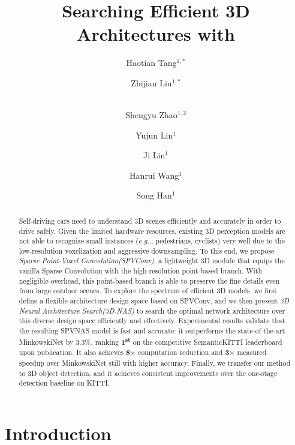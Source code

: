 \documentclass[runningheads]{llncs}
\title{Searching Efficient 3D Architectures with \\ \module}
\author{Haotian Tang$^{1,*}$ \and Zhijian Liu$^{1,*}$ \and \\ Shengyu Zhao$^{1,2}$ \and Yujun Lin$^{1}$ \and Ji Lin$^{1}$ \and Hanrui Wang$^{1}$ \and Song Han$^{1}$}
\institute{$^{1}$ Massachusetts Institute of Technology \\ $^{2}$ IIIS, Tsinghua University}
\makeatletter
\DeclareRobustCommand\onedot{\futurelet\@let@token\@onedot}
\def\@onedot{\ifx\@let@token.\else.\null\fi\xspace}
\def\eg{\emph{e.g}\onedot} \def\Eg{\emph{E.g}\onedot}
\def\module{Sparse Point-Voxel Convolution\xspace}
\def\moduleshort{SPVConv\xspace}
\def\modelshort{SPVNAS\xspace}
\def\nas{3D Neural Architecture Search\xspace}
\def\nasshort{3D-NAS\xspace}
\makeatother
\begin{document}
\pagestyle{headings}
\mainmatter

\maketitle


\begin{abstract}

Self-driving cars need to understand 3D scenes efficiently and accurately in order to drive safely. Given the limited hardware resources, existing 3D perception models are not able to recognize small instances (\eg, pedestrians, cyclists) very well due to the low-resolution voxelization and aggressive downsampling. To this end, we propose \emph{\module (\moduleshort)}, a lightweight 3D module that equips the vanilla Sparse Convolution with the high-resolution point-based branch. With negligible overhead, this point-based branch is able to preserve the fine details even from large outdoor scenes. To explore the spectrum of efficient 3D models, we first define a flexible architecture design space based on \moduleshort, and we then present \emph{\nas (\nasshort)} to search the optimal network architecture over this diverse design space efficiently and effectively. Experimental results validate that the resulting \modelshort model is fast and accurate: it outperforms the state-of-the-art MinkowskiNet by 3.3\%, ranking \textbf{1\textsuperscript{st}} on the competitive SemanticKITTI leaderboard upon publication. It also achieves \textbf{8$\times$} computation reduction and \textbf{3$\times$} measured speedup over MinkowskiNet still with higher accuracy. Finally, we transfer our method to 3D object detection, and it achieves consistent improvements over the one-stage detection baseline on KITTI.

\end{abstract} \section{Introduction}
\end{document}
